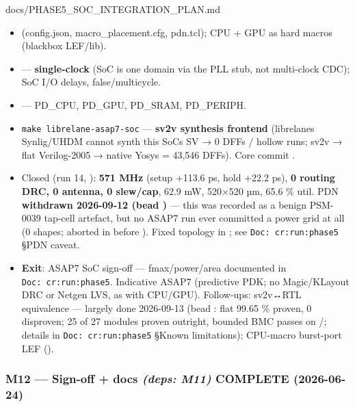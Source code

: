 \begin{relocated}{docs/PHASE5_SOC_INTEGRATION_PLAN.md}
\begin{itemize}
\tightlist
\item
  \ok{}  (config.json,
  macro\_\allowbreak{}placement.cfg, pdn.tcl); CPU + GPU as hard macros
  (blackbox LEF/lib).
\item
  \ok{}  --- \textbf{single-clock}
  (SoC is one  domain via the PLL stub, not multi-clock
  CDC); SoC I/O delays, false/\allowbreak{}multicycle.
\item
  \ok{}  --- PD\_CPU, PD\_GPU,
  PD\_SRAM, PD\_\allowbreak{}PERIPH.
\item
  \ok{} \texttt{make\ librelane-\allowbreak{}asap7-\allowbreak{}soc} ---
  \textbf{sv2v synthesis frontend} (librelane\textquotesingle s
  Synlig/\allowbreak{}UHDM cannot synth this SoC\textquotesingle s SV →
  0 DFFs / hollow runs; sv2v → flat Verilog-2005 → native Yosys = 43,546
  DFFs). Core commit .
\item
  \ok{} Closed (run 14, ): \textbf{571
  MHz} (setup +113.6 ps, hold +22.2 ps), \textbf{0 routing DRC, 0
  antenna, 0 slew/cap}, 62.9 mW, 520×520 µm, 65.6 \% util. PDN \warn{}
  \textbf{withdrawn 2026-09-12 (bead )} --- this was recorded
  as a benign PSM-0039 tap-cell artefact, but no ASAP7 run ever
  committed a power grid at all (0  shapes; 
  aborted in  before ). Fixed
  topology in ; see
  \texttt{Doc:\allowbreak{}\ cr:\allowbreak{}run:\allowbreak{}phase5}
  §PDN caveat.
\item
  \textbf{Exit}: \ok{} ASAP7 SoC sign-off ---
  fmax/\allowbreak{}power/\allowbreak{}area documented in
  \texttt{Doc:\allowbreak{}\ cr:\allowbreak{}run:\allowbreak{}phase5}.
  Indicative ASAP7 (predictive PDK; no Magic/\allowbreak{}KLayout DRC or
  Netgen LVS, as with CPU/GPU). Follow-ups: sv2v↔RTL equivalence ---
  largely done 2026-09-13 (bead : flat 99.65 \% proven, 0
  disproven; 25 of 27 modules proven outright, bounded BMC passes on
  /; details in
  \texttt{Doc:\allowbreak{}\ cr:\allowbreak{}run:\allowbreak{}phase5}
  §Known limitations); CPU-macro burst-port LEF
  ().
\end{itemize}

\subsubsection{\texorpdfstring{M12 --- Sign-off + docs \emph{(deps:
M11)} \ok{} COMPLETE
(2026-06-24)}{M12 --- Sign-off + docs (deps: M11)  COMPLETE (2026-06-24)}}\label{ds:ch:phase5-soc-integration-plan:m12-sign-off-docs-deps-m11-white-check-mark-complete-2026-06-24}


\end{relocated}
